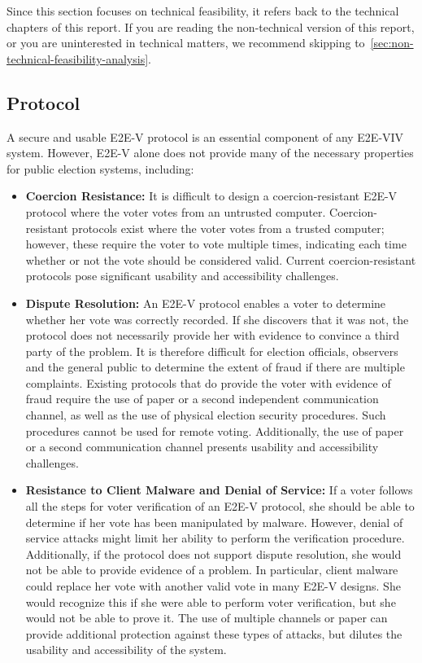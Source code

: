 Since this section focuses on technical feasibility, it refers back to
the technical chapters of this report.  If you are reading the
non-technical version of this report, or you are uninterested in
technical matters, we recommend skipping
to~\autoref{sec:non-technical-feasibility-analysis}.

\subsection{Protocol}

A secure and usable E2E-V protocol is an essential component of any
E2E-VIV system. However, E2E-V alone does not provide many of the
necessary properties for public election systems, including:

\begin{itemize}
\item \textbf{Coercion Resistance:} It is difficult to design a
  coercion-resistant E2E-V protocol where the voter votes from an
  untrusted computer. Coercion-resistant protocols exist where the
  voter votes from a trusted computer; however, these require the
  voter to vote multiple times, indicating each time whether or not
  the vote should be considered valid. Current coercion-resistant
  protocols pose significant usability and accessibility challenges.

\item \textbf{Dispute Resolution:} An E2E-V protocol enables a voter
  to determine whether her vote was correctly recorded. If she
  discovers that it was not, the protocol does not necessarily provide
  her with evidence to convince a third party of the problem. It is
  therefore difficult for election officials, observers and the
  general public to determine the extent of fraud if there are
  multiple complaints. Existing protocols that do provide the voter
  with evidence of fraud require the use of paper or a second
  independent communication channel, as well as the use of physical
  election security procedures. Such procedures cannot be used for
  remote voting. Additionally, the use of paper or a second
  communication channel presents usability and accessibility
  challenges.

\item \textbf{Resistance to Client Malware and Denial of Service:} If
  a voter follows all the steps for voter verification of an E2E-V
  protocol, she should be able to determine if her vote has been
  manipulated by malware. However, denial of service attacks might
  limit her ability to perform the verification
  procedure. Additionally, if the protocol does not support dispute
  resolution, she would not be able to provide evidence of a
  problem. In particular, client malware could replace her vote with
  another valid vote in many E2E-V designs. She would recognize this
  if she were able to perform voter verification, but she would not be
  able to prove it. The use of multiple channels or paper can provide
  additional protection against these types of attacks, but dilutes the
  usability and accessibility of the system.


\end{itemize}
